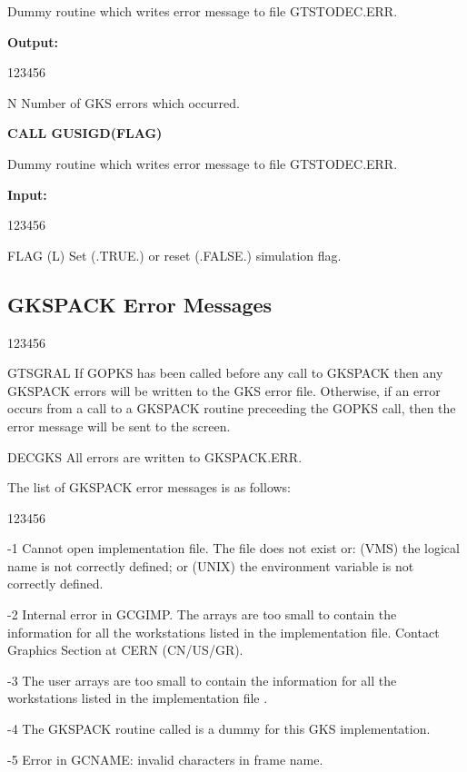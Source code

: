 \begin{OL}
Dummy routine which writes error message to file GTSTODEC.ERR.
 
{\bf Output:}
\begin{DLtt}{123456}
\item[N]Number of GKS errors which occurred.
\end{DLtt}
\item {\bf CALL GUSIGD(FLAG)}
 
Dummy routine which writes error message to file GTSTODEC.ERR.
 
{\bf Input:}
\begin{DLtt}{123456}
\item[FLAG (L)]Set (.TRUE.) or reset (.FALSE.) simulation flag.
\end{DLtt}
\end{OL}
\subsection{GKSPACK Error Messages}
 
\begin{DLtt}{123456}
\item[GTSGRAL]
If GOPKS has been called before any call to GKSPACK then any GKSPACK
errors will be written to the GKS error file. Otherwise, if an error occurs
from a call to a GKSPACK routine preceeding the GOPKS call, then the error
message will be sent to the screen.
\item[DECGKS]
All errors are written to GKSPACK.ERR.
\end{DLtt}
 
The list of GKSPACK error messages is as follows:
\begin{DLtt}{123456}
\item[-1]Cannot open implementation file.
The file does not exist or: (VMS) the logical name 
is not correctly defined; or (UNIX) the environment variable 
is not correctly defined.
\item[-2]Internal error in GCGIMP. The arrays are too small to contain
the information for all the workstations listed in the implementation file.
Contact Graphics Section at CERN (CN/US/GR).
\item[-3]The user arrays are too small to contain the information for all
the workstations listed in the implementation file .
\item[-4]The GKSPACK routine called is a dummy for this GKS implementation.
\item[-5]Error in GCNAME: invalid characters in frame name.
\end{DLtt}
